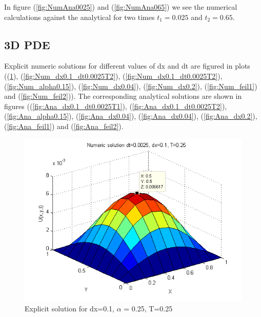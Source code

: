 \documentclass[a4paper,10pt]{article}
\begin{document}
In figure (\ref{fig:NumAna0025}) and (\ref{fig:NumAna065}) we see the numerical calculations against the analytical for two times $t_1 = 0.025$
and $t_2 = 0.65$.

\subsection{3D PDE}
Explicit numeric solutions for different values of dx and dt are figured in plots ((\ref{fig:Num_dx0.1_dt0.0025T1}), (\ref{fig:Num_dx0.1_dt0.0025T2}), (\ref{fig:Num_dx0.1_dt0.0025T2}), (\ref{fig:Num_alpha0.15}), (\ref{fig:Num_dx0.04}), (\ref{fig:Num_dx0.2}), (\ref{fig:Num_feil1}) and (\ref{fig:Num_feil2})).
The corresponding analytical solutions are shown in figures ((\ref{fig:Ana_dx0.1_dt0.0025T1}), (\ref{fig:Ana_dx0.1_dt0.0025T2}), (\ref{fig:Ana_alpha0.15}), (\ref{fig:Ana_dx0.04}), (\ref{fig:Ana_dx0.04}), (\ref{fig:Ana_dx0.2}), (\ref{fig:Ana_feil1}) and (\ref{fig:Ana_feil2}).

\begin{figure}
  \begin{center}
    \includegraphics[scale=0.5]{num_dt00025_dx01_T025}
    \caption{Explicit solution for dx=0.1, $\alpha$ = 0.25, T=0.25}
    \label{fig:Num_dx0.1_dt0.0025T1}
  \end{center}

\end{figure}
\end{document}
